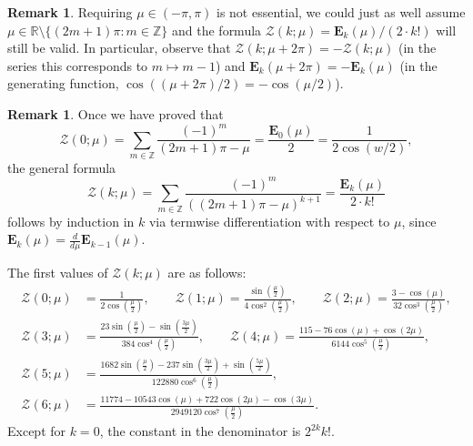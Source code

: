 \documentclass[11pt, oneside]{article}
\newcommand{\Z}{\mathbb{Z}}
\newcommand{\R}{\mathbb{R}}
\newcommand{\bfE}{\mathbf{E}}
\newcommand{\calZ}{\mathcal{Z}}
\theoremstyle{plain}
\theoremstyle{definition}
\newtheorem{remark}[theorem]{Remark}
\begin{document}
\begin{remark}
Requiring $\mu \in (-\pi,\pi)$ is not essential, we could just as well assume $\mu \in \R \setminus \{(2m+1)\pi : m\in\Z\}$ and the formula $\calZ(k;\mu) = \bfE_k(\mu)/(2 \cdot k!)$ will still be valid. In particular, observe that $\calZ(k;\mu+2\pi) = -\calZ(k;\mu)$ (in the series this corresponds to $m \mapsto m-1$) and $\bfE_k(\mu+2\pi) = -\bfE_k(\mu)$ (in the generating function, $\cos((\mu+2\pi)/2) = -\cos(\mu/2)$).
\end{remark}

\begin{remark}
Once we have proved that
\[
  \calZ(0;\mu) = \sum_{m\in\Z} \frac{(-1)^m}{(2m+1)\pi - \mu}
  = \frac{\bfE_0(\mu)}{2} = \frac{1}{2\cos(w/2)},
\]
the general formula
\[
  \calZ(k;\mu) = \sum_{m\in\Z} \frac{(-1)^m}{((2m+1)\pi - \mu)^{k+1}}
  = \frac{\bfE_k(\mu)}{2 \cdot k!}
\]
follows by induction in $k$ via termwise differentiation with respect to $\mu$, since $\bfE_k(\mu) = \frac{d}{d\mu} \bfE_{k-1}(\mu)$.
\end{remark}

The first values of $\calZ(k;\mu)$ are as follows:
\begin{align*}
\calZ(0;\mu) &=
\frac{1}{2\cos(\frac{\mu}{2})},
\qquad
\calZ(1;\mu) =
\frac{\sin(\frac{\mu}{2})}{4\cos^2(\frac{\mu}{2})},
\qquad
\calZ(2;\mu) =
\frac{3 - \cos(\mu)}{32 \cos^3(\frac{\mu}{2})},
\\
\calZ(3;\mu) &=
\frac{23 \sin(\frac{\mu}{2}) - \sin(\frac{3\mu}{2})}{384 \cos^4(\frac{\mu}{2})},
\qquad
\calZ(4;\mu) =
\frac{115 - 76 \cos(\mu) + \cos(2\mu)}{6144 \cos^5(\frac{\mu}{2})},
\\
\calZ(5;\mu) &=
\frac{1682 \sin(\frac{\mu}{2}) - 237 \sin(\frac{3\mu}{2}) + \sin(\frac{5\mu}{2})}
  {122880 \cos^6(\frac{\mu}{2})},
\\
\calZ(6;\mu) &=
\frac{11774 - 10543 \cos(\mu) + 722 \cos(2\mu) - \cos(3\mu)}{2949120 \cos^7(\frac{\mu}{2})}.
\end{align*}
Except for $k=0$, the constant in the denominator is $2^{2k}k!$.
\end{document}
